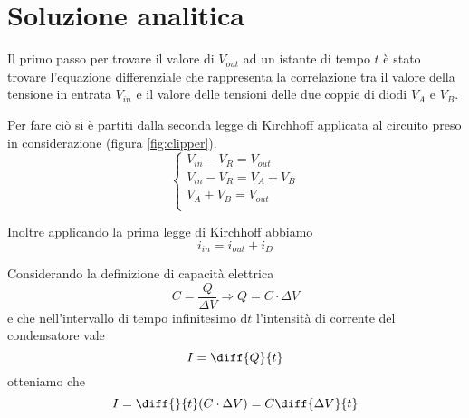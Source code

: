 \chapter{Soluzione analitica}
	Il primo passo per trovare il valore di $V_{out}$ ad un istante di tempo $t$ è stato trovare l'equazione differenziale che rappresenta la correlazione tra il valore della tensione in entrata $V_{in}$ e il valore delle tensioni delle due coppie di diodi $V_{A}$ e $V_{B}$.
	
	Per fare ciò si è partiti dalla seconda legge di Kirchhoff applicata al circuito preso in considerazione (figura \ref{fig:clipper}).
	\[
	\begin{cases}
		V_{in}-V_{R} = V_{out}\\
		V_{in}-V_{R} = V_{A}+V_{B}\\
		V_{A}+V_{B} = V_{out}\\
	\end{cases}
	\]
	
	Inoltre applicando la prima legge di Kirchhoff abbiamo
	\[
		i_{in} = i_{out}+i_{D}
	\]
	
	Considerando la definizione di capacità elettrica
	\[
		C = \frac{Q}{\Delta V} \Rightarrow Q = C \cdot \Delta V
	\]
	e che nell'intervallo di tempo infinitesimo $\mathrm{d}t$ l'intensità di corrente del condensatore vale 
	\[
		I = \diff{Q}{t}
	\]
	otteniamo che
	\[
		I = \diff{}{t}(C \cdot \Delta V) = C\diff{\Delta V}{t}
	\]
	\pagebreak
		
